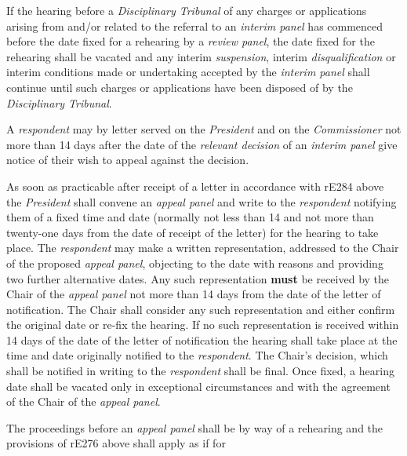 \par
If the hearing before a \emph{Disciplinary Tribunal} of any charges or
applications arising from and/or related to the referral to
an \emph{interim panel} has commenced before the date fixed for a
rehearing by a \emph{review panel}, the date fixed for the rehearing
shall be vacated and any interim \emph{suspension},
interim \emph{disqualification} or interim conditions made or
undertaking accepted by the \emph{interim panel} shall continue until
such charges or applications have been disposed of by
the \emph{Disciplinary Tribunal}.\\
\par
{}
A \emph{respondent} may by letter served on the \emph{President} and on
the \emph{Commissioner }not more than 14 days after the date of
the \emph{relevant decision} of an \emph{interim panel} give notice of
their wish to appeal against the decision.\\
\par
As soon as practicable after receipt of a letter in accordance with
rE284 above the \emph{President} shall convene an \emph{appeal
panel} and write to the \emph{respondent} notifying them of a fixed time
and date (normally not less than 14 and not more than twenty-one days
from the date of receipt of the letter) for the hearing to take place.
The \emph{respondent} may make a written representation, addressed to
the Chair of the proposed \emph{appeal panel}, objecting to the date
with reasons and providing two further alternative dates. Any such
representation  \textcolor{myred}{\textbf{must}} be received by the Chair of the \emph{appeal
panel} not more than 14 days from the date of the letter of
notification. The Chair shall consider any such representation and
either confirm the original date or re-fix the hearing. If no such
representation is received within 14 days of the date of the letter of
notification the hearing shall take place at the time and date
originally notified to the \emph{respondent}. The Chair's decision,
which shall be notified in writing to the \emph{respondent} shall be
final. Once fixed, a hearing date shall be vacated only in exceptional
circumstances and with the agreement of the Chair of the \emph{appeal
panel}.\\
\par
The proceedings before an \emph{appeal panel} shall be by way of a
rehearing and the provisions of rE276 above shall apply as if for
